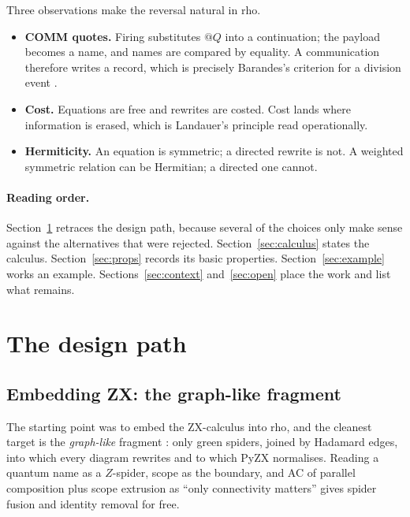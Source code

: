 \documentclass[11pt,a4paper]{article}
\theoremstyle{plain}
\theoremstyle{definition}
\theoremstyle{remark}
\newcommand{\rhoc}{\textsf{rho}}
\begin{document}
Three observations make the reversal natural in \rhoc{}.
\begin{itemize}[leftmargin=1.5em]
\item \textbf{COMM quotes.} Firing substitutes $@Q$ into a continuation; the
  payload becomes a name, and names are compared by equality. A communication
  therefore writes a record, which is precisely Barandes's criterion for a
  division event \cite{Barandes}.
\item \textbf{Cost.} Equations are free and rewrites are costed. Cost lands
  where information is erased, which is Landauer's principle read
  operationally.
\item \textbf{Hermiticity.} An equation is symmetric; a directed rewrite is
  not. A weighted symmetric relation can be Hermitian; a directed one cannot.
\end{itemize}

\paragraph{Reading order.} Section~\ref{sec:path} retraces the design path,
because several of the choices only make sense against the alternatives that
were rejected. Section~\ref{sec:calculus} states the calculus.
Section~\ref{sec:props} records its basic properties.
Section~\ref{sec:example} works an example. Sections~\ref{sec:context}
and~\ref{sec:open} place the work and list what remains.

\section{The design path}\label{sec:path}

\subsection{Embedding ZX: the graph-like fragment}

The starting point was to embed the ZX-calculus \cite{CoeckeDuncan} into
\rhoc{}, and the cleanest target is the \emph{graph-like} fragment
\cite{DKPW}: only green spiders, joined by Hadamard edges, into which every
diagram rewrites and to which PyZX normalises. Reading a quantum name as a
$Z$-spider, scope as the boundary, and AC of parallel composition plus scope
extrusion as ``only connectivity matters'' gives spider fusion and identity
removal for free.
\end{document}

